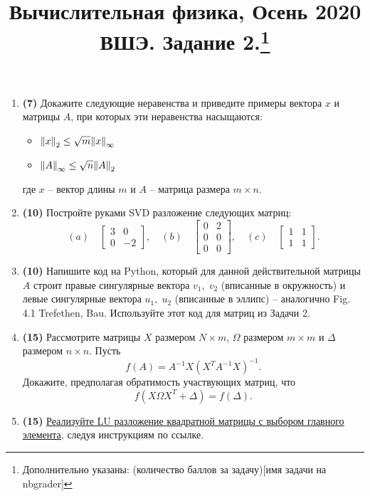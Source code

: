 \documentclass[prb,papersize=a4paper,notitlepage]{revtex4-1}%
\begin{document}
\title{Вычислительная физика, Осень 2020 ВШЭ. Задание 2.\footnote{Дополнительно указаны: (количество баллов за задачу)[имя задачи на nbgrader]}}
\maketitle


\begin{enumerate}
\item \textbf{(7)} Докажите следующие неравенства и приведите примеры вектора $x$ и матрицы $A$, при которых эти неравенства насыщаются:
\begin{itemize}
\item $\norm{x}_2 \le \sqrt{m}\norm{x}_\infty$
\item $\norm{A}_\infty \le \sqrt{n} \norm{A}_2$
\end{itemize}
где $x$ -- вектор длины $m$ и $A$ -- матрица размера $m\times n$.

\item \textbf{(10)} Постройте руками SVD разложение следующих матриц:
$$
(a)\quad\begin{bmatrix}
3 & 0\\
0 & -2
\end{bmatrix},\quad
(b)\quad\begin{bmatrix}
0 & 2\\
0 & 0\\
0 & 0
\end{bmatrix},\quad
(c)\quad\begin{bmatrix}
1 & 1\\
1 & 1
\end{bmatrix}.
$$

\item \textbf{(10)} Напишите код на Python, который для данной действительной матрицы $A$ строит правые сингулярные вектора $v_1,\; v_2$ (вписанные в окружность) и  левые сингулярные вектора $u_1,\; u_2$ (вписанные в эллипс) -- аналогично Fig. 4.1 Trefethen, Bau. Используйте этот код для матриц из Задачи 2.

\item \textbf{(15)} Рассмотрите матрицы $X$ размером $N\times m$, $ \Omega$ размером $m\times m$ и $ \Delta$ размером $n\times n$. Пусть
$$
f(A) = A^{-1}X(X^T A^{-1}X)^{-1}.
$$
Докажите, предполагая обратимость участвующих матриц, что $$f(X \Omega X^T + \Delta)=f(\Delta).$$

\item \textbf{(15)} \href{https://github.com/ev-br/CP2020/blob/master/week_1_LU_pivoting.ipynb}{Реализуйте LU разложение квадратной матрицы с выбором главного элемента}, следуя инструкциям по ссылке.


\end{enumerate}
\end{document}
